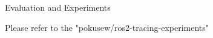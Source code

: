 \chap[evaluation] Evaluation and Experiments

Please refer to the "pokusew/ros2-tracing-experiments"
